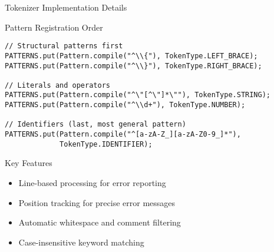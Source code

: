 \documentclass{beamer}
\begin{document}
\begin{frame}[fragile]{Tokenizer Implementation Details}
\begin{block}{Pattern Registration Order}
\begin{lstlisting}[basicstyle=\tiny]
// Structural patterns first
PATTERNS.put(Pattern.compile("^\\{"), TokenType.LEFT_BRACE);
PATTERNS.put(Pattern.compile("^\\}"), TokenType.RIGHT_BRACE);

// Literals and operators  
PATTERNS.put(Pattern.compile("^\"[^\"]*\""), TokenType.STRING);
PATTERNS.put(Pattern.compile("^\\d+"), TokenType.NUMBER);

// Identifiers (last, most general pattern)
PATTERNS.put(Pattern.compile("^[a-zA-Z_][a-zA-Z0-9_]*"), 
             TokenType.IDENTIFIER);
\end{lstlisting}
\end{block}

\begin{block}{Key Features}
\begin{itemize}
    \item Line-based processing for error reporting
    \item Position tracking for precise error messages  
    \item Automatic whitespace and comment filtering
    \item Case-insensitive keyword matching
\end{itemize}
\end{block}
\end{frame}
\end{document}
